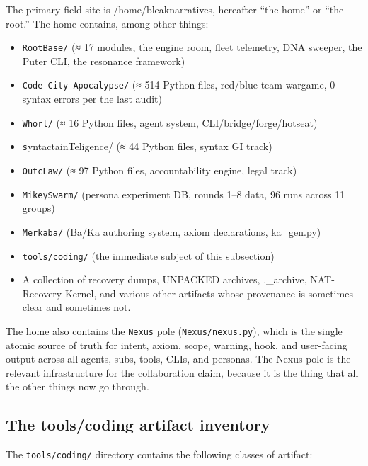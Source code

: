 \documentclass[10pt,twocolumn]{article}
\begin{document}
The primary field site is /home/bleaknarratives, hereafter ``the home'' or ``the root.'' The home contains, among other things:

\begin{itemize}
  \item \texttt{RootBase/} (≈ 17 modules, the engine room, fleet telemetry, DNA sweeper, the Puter CLI, the resonance framework)
  \item \texttt{Code-City-Apocalypse/} (≈ 514 Python files, red/blue team wargame, 0 syntax errors per the last audit)
  \item \texttt{Whorl/} (≈ 16 Python files, agent system, CLI/bridge/forge/hotseat)
  \item \texttt syntactainTeligence/ (≈ 44 Python files, syntax GI track)
  \item \texttt{OutcLaw/} (≈ 97 Python files, accountability engine, legal track)
  \item \texttt{MikeySwarm/} (persona experiment DB, rounds 1--8 data, 96 runs across 11 groups)
  \item \texttt{Merkaba/} (Ba/Ka authoring system, axiom declarations, ka\_gen.py)
  \item \texttt{tools/coding/} (the immediate subject of this subsection)
  \item A collection of recovery dumps, UNPACKED archives, .\_archive, NAT-Recovery-Kernel, and various other artifacts whose provenance is sometimes clear and sometimes not.
\end{itemize}

The home also contains the \texttt{Nexus} pole (\texttt{Nexus/nexus.py}), which is the single atomic source of truth for intent, axiom, scope, warning, hook, and user-facing output across all agents, subs, tools, CLIs, and personas. The Nexus pole is the relevant infrastructure for the collaboration claim, because it is the thing that all the other things now go through.

\subsection{The tools/coding artifact inventory}

The \texttt{tools/coding/} directory contains the following classes of artifact:
\end{document}
